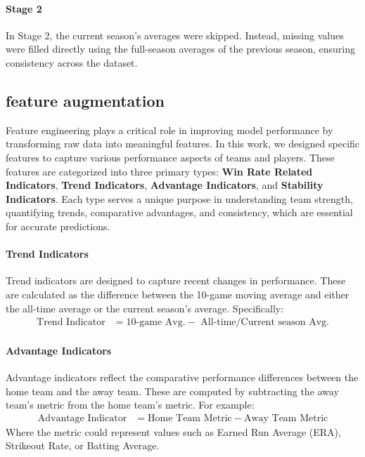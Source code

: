 \documentclass[12pt,a4paper]{article}
\begin{document}
\paragraph{\textbf{Stage 2}}
In Stage 2, the current season's averages were skipped. Instead, missing values were filled directly using the full-season averages of the previous season, ensuring consistency across the dataset.

\subsection{feature augmentation}
Feature engineering plays a critical role in improving model performance by transforming raw data into meaningful features. In this work, we designed specific features to capture various performance aspects of teams and players. These features are categorized into three primary types: \textbf{Win Rate Related Indicators}, \textbf{Trend Indicators}, \textbf{Advantage Indicators}, and \textbf{Stability Indicators}. Each type serves a unique purpose in understanding team strength, quantifying trends, comparative advantages, and consistency, which are essential for accurate predictions.

\paragraph{\textbf{Trend Indicators}}
Trend indicators are designed to capture recent changes in performance. These are calculated as the difference between the 10-game moving average and either the all-time average or the current season's average. Specifically:
\begin{align*}
\text{Trend Indicator} &= \text{10-game Avg.} - \text{ All-time/Current season Avg.}
\end{align*}

\paragraph{\textbf{Advantage Indicators}}
Advantage indicators reflect the comparative performance differences between the home team and the away team. These are computed by subtracting the away team's metric from the home team's metric. For example:
\begin{align*}
\text{Advantage Indicator} &= \text{Home Team Metric} - \text{Away Team Metric}
\end{align*}
Where the metric could represent values such as Earned Run Average (ERA), Strikeout Rate, or Batting Average.
\end{document}

